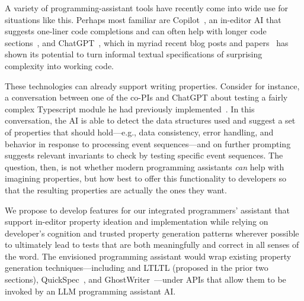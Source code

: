 A variety of
programming-assistant tools have recently come into wide use for situations
like this. Perhaps most familiar are
Copilot~\cite{tool:copilot}, an in-editor AI that suggests one-liner code
completions and can often help with longer code
sections~\cite{ref:dohmke2022github}, and ChatGPT~\cite{tool:chatgpt}, which in
myriad recent  blog posts and papers~\cn{} has shown its potential to turn
informal textual specifications of surprising complexity into working code.

These technologies can already
support writing properties. Consider for instance, a conversation
between one of the co-PIs and ChatGPT about testing a fairly complex
Typescript module he
had previously implemented~\cite{ref:chatgptpbtexample}.  In this
conversation, the AI is
able to detect the data structures used
and suggest a set of properties that should hold---e.g., data
consistency, error handling, and
behavior in response to processing event sequences---and on further
prompting suggests relevant
invariants to check by testing specific event sequences. The question,
then, is not
whether modern programming assistants \emph{can} help with imagining
properties, but how best to offer this functionality to
developers so that the resulting properties are actually the ones they
want. 

We propose to develop features for our integrated programmers' assistant
that support in-editor property ideation and
implementation while relying on developer's cognition and trusted
property generation patterns wherever possible to ultimately lead to tests
that are both meaningfully and correct in all senses of the word. The envisioned
programming assistant would wrap existing property generation  techniques---including \Mica{}
and LTLTL (proposed in the prior two sections), QuickSpec~\cite{ref:claessen2010quickspec}, and GhostWriter~\cite{ref:ghostwriter}---under APIs that allow them to be invoked
by an LLM programming assistant AI.

